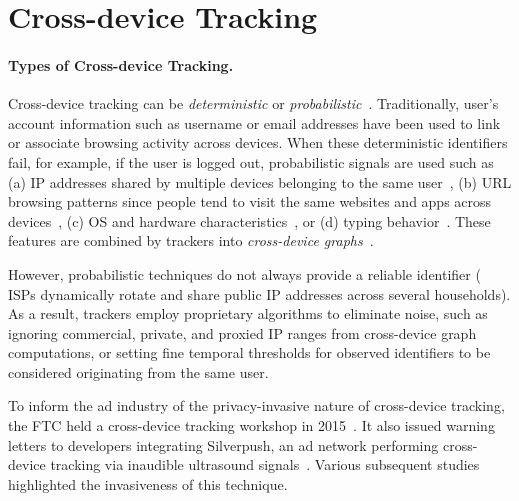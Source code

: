 \vspace{-2mm}
\section{Cross-device Tracking}
\label{sec:cross-device}
\vspace{-4mm}

\paragraph{Types of Cross-device Tracking.} Cross-device tracking can be \textit{deterministic} or \textit{probabilistic}~\cite{kimProbabilisticVisitorStitching2017,cottaOffPolicyEvaluationProbabilistic2019,brookmanCrossDeviceTrackingMeasurement2017}. Traditionally, user’s account information such as username or email addresses have been used to link or associate browsing activity across devices. When these deterministic identifiers fail, for example, if the user is logged out, probabilistic signals are used such as (a) IP addresses shared by multiple devices belonging to the same user~\cite{diaz-moralesCrossDeviceTrackingMatching2015}, (b) URL browsing patterns since people tend to visit the same websites and apps across devices~\cite{phanCrossDeviceMatching2017}, (c) OS and hardware characteristics~\cite{caoCrossBrowserFingerprintingOS2017}, or (d) typing behavior~\cite{yuanCrossdeviceTrackingIdentification2018}. These features are combined by trackers into \textit{cross-device graphs}~\cite{zimmeckPrivacyAnalysisCrossdevice2017,wangGraphTrackGraphbasedCrossDevice2022}.

 However, probabilistic techniques do not always provide a reliable identifier (\eg{} ISPs dynamically rotate and share public IP addresses across several households). As a result, trackers employ proprietary algorithms to eliminate noise, such as ignoring commercial, private, and proxied IP ranges from cross-device graph computations, or setting fine temporal thresholds for observed identifiers to be considered originating from the same user.

 To inform the ad industry of the privacy-invasive nature of cross-device tracking, the FTC held a cross-device tracking workshop in 2015~\cite{ftcCrossDeviceTracking2015}. It also issued warning letters to developers integrating Silverpush, an ad network performing cross-device tracking via inaudible ultrasound signals~\cite{ftcFTCIssuesWarning2016}. Various subsequent studies~\cite{mavroudisPrivacySecurityUltrasound2017,arpPrivacyThreatsUltrasonic2017,matyuninTrackingPrivateBrowsing2018} highlighted the invasiveness of this technique. 

